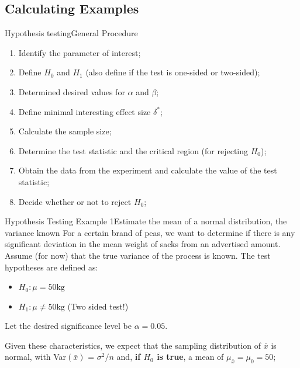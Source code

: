 \subsection{Calculating Examples}
\begin{frame}{Hypothesis testing}{General Procedure}
  \begin{enumerate}
    \item Identify the parameter of interest;
    \item Define $H_0$ and $H_1$ (also define if the test is one-sided or two-sided);
    \item Determined desired values for $\alpha$ and $\beta$;
    \item Define minimal interesting effect size $\delta^{*}$;
    \item Calculate the sample size;
    \item Determine the test statistic and the critical region (for rejecting $H_0$);
    \item Obtain the data from the experiment and calculate the value of the test statistic;
    \item Decide whether or not to reject $H_0$;
  \end{enumerate}
\end{frame}

\begin{frame}{Hypothesis Testing Example 1}{Estimate the mean of a normal distribution, the variance known}
  For a certain brand of peas, we want to determine if there is any significant deviation in the mean weight of sacks from an advertised amount. Assume (for now) that the true variance of the process is known. The test hypotheses are defined as:\medskip

  \begin{itemize}
    \item $H_0: \mu = 50\text{kg}$
    \item $H_1: \mu \neq 50\text{kg}$ (Two sided test!)
  \end{itemize}\medskip

  Let the desired significance level be $\alpha = 0.05$.\medskip

  Given these characteristics, we expect that the sampling distribution of $\bar{x}$ is normal, with Var$(\bar{x})$ = $\sigma^2/n$ and, {\bf if $H_0$ is true}, a mean of $\mu_{\bar{x}} = \mu_0 = 50$;
\end{frame}

